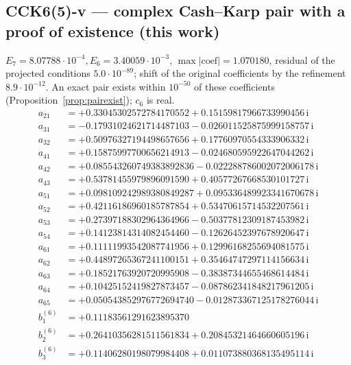 \subsection*{CCK6(5)-v --- complex Cash--Karp pair with a proof of existence (this work)}
$E_{7}=8.07788\cdot10^{-4}, E_{6}=3.40059\cdot10^{-3}$, $\max|\text{coef}|=1.070180$, residual of the projected conditions $5.0\cdot10^{-89}$; shift of the original coefficients by the refinement $8.9\cdot10^{-12}$. An exact pair exists within $10^{-50}$ of these coefficients (Proposition~\ref{prop:pairexist}); $c_6$ is real.
{\small\allowdisplaybreaks
\begin{align*}
a_{21} &= +0.33045302572784170552 + 0.15159817966733990456\,\mathrm{i}\\
a_{31} &= -0.17931024621714487103 - 0.026011525875999158757\,\mathrm{i}\\
a_{32} &= +0.50976327194498657656 + 0.17760970554333906332\,\mathrm{i}\\
a_{41} &= +0.15875997700656214913 - 0.024680595922647044262\,\mathrm{i}\\
a_{42} &= +0.085543260749383892836 - 0.022288786002072006178\,\mathrm{i}\\
a_{43} &= +0.53781455979896091590 + 0.40577267668530101727\,\mathrm{i}\\
a_{51} &= +0.098109242989380849287 + 0.095336489923341670678\,\mathrm{i}\\
a_{52} &= +0.42116186960185787854 + 0.53470615714532207561\,\mathrm{i}\\
a_{53} &= +0.27397188302964364966 - 0.50377812309187453982\,\mathrm{i}\\
a_{54} &= +0.14123814314082454460 - 0.12626452397678920647\,\mathrm{i}\\
a_{61} &= +0.11111993542087741956 + 0.12996168255694081575\,\mathrm{i}\\
a_{62} &= +0.44897265367241100151 + 0.35464747297114156634\,\mathrm{i}\\
a_{63} &= +0.18521763920720995908 - 0.38387344655468614484\,\mathrm{i}\\
a_{64} &= +0.10425152419827873457 - 0.087862341848217961205\,\mathrm{i}\\
a_{65} &= +0.050543852976772694740 - 0.012873367125178276044\,\mathrm{i}\\[1mm]
b^{(6)}_{1} &= +0.11183561291623895370\\
b^{(6)}_{2} &= +0.26410356281511561834 + 0.20845321464660605196\,\mathrm{i}\\
b^{(6)}_{3} &= +0.11406280198079984408 + 0.011073880368135495114\,\mathrm{i}\\

\end{align*}}
